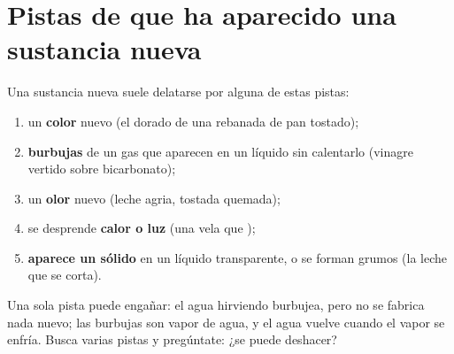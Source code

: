 \section{Pistas de que ha aparecido una sustancia nueva}

\begin{method}\label{met:g5:irreversible-changes:clues}
Una sustancia nueva suele delatarse por alguna de estas pistas:
\begin{enumerate}
  \item un \textbf{color} nuevo (el dorado de una rebanada de pan
        tostado);
  \item \textbf{burbujas} de un gas que aparecen en un líquido sin
        calentarlo (vinagre vertido sobre bicarbonato);
  \item un \textbf{olor} nuevo (leche agria, tostada quemada);
  \item se desprende \textbf{calor o luz} (una vela que );
  \item \textbf{aparece un sólido} en un líquido transparente, o se
        forman grumos (la leche que se corta).
\end{enumerate}
Una sola pista puede engañar: el agua hirviendo burbujea, pero no se
fabrica nada nuevo; las burbujas son vapor de agua, y el agua vuelve
cuando el vapor se enfría. Busca varias pistas y pregúntate: ¿se puede
deshacer?
\end{method}

